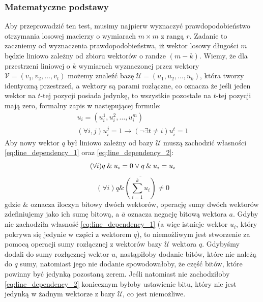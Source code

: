 \subsubsection{Matematyczne podstawy}
Aby przeprowadzić ten test, musimy najpierw wyznaczyć prawdopodobieństwo otrzymania losowej macierzy o wymiarach $m \times m$ z rangą $r$. Zadanie to zaczniemy od wyznaczenia prawdopodobieństwa, iż wektor losowy długości $m$ będzie liniowo zależny od zbioru wektorów o randze $(m - k)$. Wiemy, że dla przestrzeni liniowej o $k$ wymiarach wyznaczonej przez wektory $\mathcal{V} = (v_1, v_2, \dots, v_t)$ możemy znaleźć bazę $\mathcal{U} = (u_1, u_2, \dots, u_k)$, która tworzy identyczną przestrzeń, a wektory są parami rozłączne, co oznacza że jeśli jeden wektor na $t$-tej pozycji posiada jedynkę, to wszystkie pozostałe na $t$-tej pozycji mają zero, formalny zapis w następującej formule:
\begin{equation}
\label{eq:pair_disjoint}
    \begin{gathered}
        u_i = (u_i^1, u_i^2, \dots, u_i^m)\\
        (\forall i, j) u_i^j = 1 \rightarrow (\neg \exists t \not = i) u_i^t = 1
    \end{gathered}
\end{equation}
Aby nowy wektor $q$ był liniowo zależny od bazy $\mathcal{U}$ muszą zachodzić własności \ref{eq:line_dependency_1} oraz \ref{eq:line_dependency_2}:
\begin{equation}
    \label{eq:line_dependency_1}
    (\forall i) q \mathbin{\&} u_i = 0 \lor q \mathbin{\&} u_i = u_i\\
\end{equation}
\begin{equation}
    \label{eq:line_dependency_2}
    (\forall i) q \mathbin{\&} \overline{\left(\sum_{i=1}^{k} u_i \right)} \not= 0
\end{equation}
gdzie $\mathbin{\&}$ oznacza iloczyn bitowy dwóch wektorów, operację sumy dwóch wektorów zdefiniujemy jako ich sumę bitową, a $\overline{a}$ oznacza negację bitową wektora $a$. 
Gdyby nie zachodziła własność \ref{eq:line_dependency_1} (a więc istnieje wektor $u_i$, który pokrywa się jedynie w części z wektorem $q$), to niemożliwym jest stworzenie za pomocą operacji sumy rozłącznej z wektorów bazy $\mathcal{U}$ wektora $q$. Gdybyśmy dodali do sumy rozłącznej wektor $u_i$ nastąpiłoby dodanie bitów, które nie należą do $q$ sumy, natomiast jego nie dodanie spowodowałoby, że część bitów, które powinny być jedynką pozostaną zerem. 
Jeśli natomiast nie zachodziłoby \ref{eq:line_dependency_2} koniecznym byłoby ustawienie bitu, który nie jest jedynką w żadnym wektorze z bazy $\mathcal{U}$, co jest niemożliwe.
